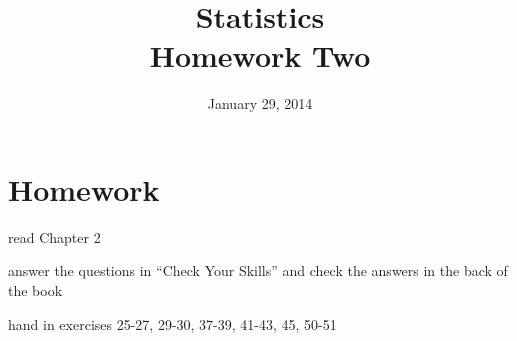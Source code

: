 \documentclass{exam}
\author{}
\date{January 29, 2014}
\title{Statistics \\ Homework Two}
\begin{document}
  \maketitle

  \section{Homework}

  \ifprintanswers
  \else
    \begin{itemize*}
      \item read Chapter 2 
      \item answer the questions in ``Check Your Skills'' and check the answers
        in the back of the book
      \item hand in exercises 25-27, 29-30, 37-39, 41-43, 45, 50-51
    \end{itemize*}
  \fi
\end{document}
